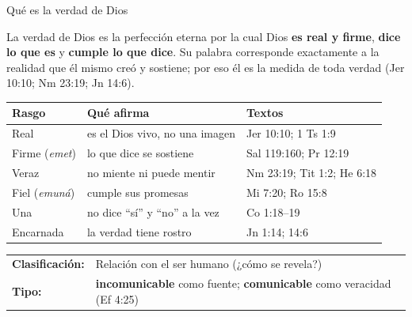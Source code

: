 \documentclass[hyperref={bookmarks=false},aspectratio=169]{beamer}
\newcommand{\destacar}[1]{\textbf{\textcolor{azul}{#1}}}
\begin{document}
\begin{frame}{Qué es la verdad de Dios}
\begin{tcolorbox}[colback=papiro,colframe=azul,boxrule=1pt,arc=3pt,fonttitle=\bfseries\small,title=Definición]
\small La verdad de Dios es la perfección eterna por la cual Dios \destacar{es real y firme}, \destacar{dice lo que es} y \destacar{cumple lo que dice}. Su palabra corresponde exactamente a la realidad que él mismo creó y sostiene; por eso él es la medida de toda verdad (Jer 10:10; Nm 23:19; Jn 14:6).
\end{tcolorbox}
\scriptsize\renewcommand{\arraystretch}{1.18}
\begin{tabular}{@{}>{\RaggedRight\arraybackslash}p{2.4cm}>{\RaggedRight\arraybackslash}p{5.6cm}>{\RaggedRight\arraybackslash}p{3.6cm}@{}}
\toprule
\textbf{Rasgo} & \textbf{Qué afirma} & \textbf{Textos} \\ \midrule
Real & es el Dios vivo, no una imagen & Jer 10:10; 1 Ts 1:9 \\
Firme (\emph{emet}) & lo que dice se sostiene & Sal 119:160; Pr 12:19 \\
Veraz & no miente ni puede mentir & Nm 23:19; Tit 1:2; He 6:18 \\
Fiel (\emph{emuná}) & cumple sus promesas & Mi 7:20; Ro 15:8 \\
Una & no dice ``sí'' y ``no'' a la vez & 2 Co 1:18--19 \\
Encarnada & la verdad tiene rostro & Jn 1:14; 14:6 \\
\bottomrule
\end{tabular}\par\smallskip
\begin{center}\footnotesize
\begin{tabular}{ll}
\textbf{Clasificación:} & Relación con el ser humano (¿cómo se revela?)\\
\textbf{Tipo:} & \destacar{incomunicable} como fuente; \destacar{comunicable} como veracidad (Ef 4:25)\\
\end{tabular}
\end{center}
\end{frame}
\end{document}
